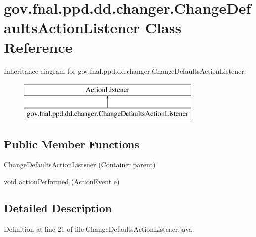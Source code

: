 \hypertarget{classgov_1_1fnal_1_1ppd_1_1dd_1_1changer_1_1ChangeDefaultsActionListener}{\section{gov.\-fnal.\-ppd.\-dd.\-changer.\-Change\-Defaults\-Action\-Listener Class Reference}
\label{classgov_1_1fnal_1_1ppd_1_1dd_1_1changer_1_1ChangeDefaultsActionListener}
}
Inheritance diagram for gov.\-fnal.\-ppd.\-dd.\-changer.\-Change\-Defaults\-Action\-Listener\-:\begin{figure}[H]
\begin{center}
\leavevmode
\includegraphics[height=2.000000cm]{classgov_1_1fnal_1_1ppd_1_1dd_1_1changer_1_1ChangeDefaultsActionListener}
\end{center}
\end{figure}
\subsection*{Public Member Functions}
\begin{DoxyCompactItemize}
\item 
\hyperlink{classgov_1_1fnal_1_1ppd_1_1dd_1_1changer_1_1ChangeDefaultsActionListener_a3b0b37ba3ebf3a0b878c7715b46c5c0c}{Change\-Defaults\-Action\-Listener} (Container parent)
\item 
void \hyperlink{classgov_1_1fnal_1_1ppd_1_1dd_1_1changer_1_1ChangeDefaultsActionListener_a29a64447afe74de6954ba633ee8775ec}{action\-Performed} (Action\-Event e)
\end{DoxyCompactItemize}


\subsection{Detailed Description}


Definition at line 21 of file Change\-Defaults\-Action\-Listener.\-java.



